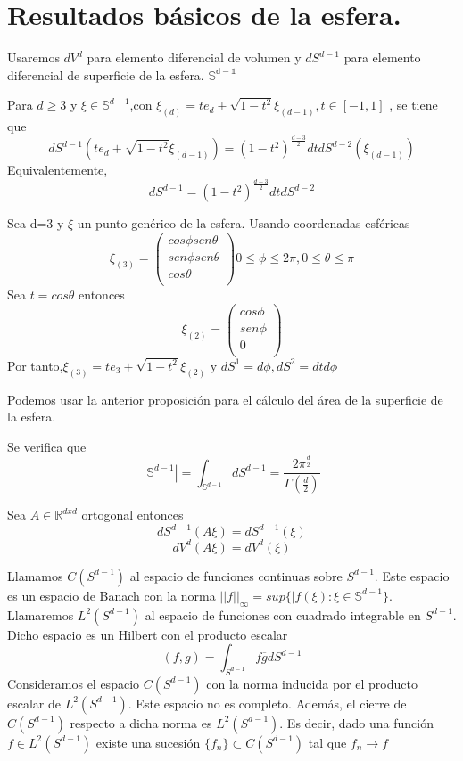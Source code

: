 \chapter{Resultados básicos de la esfera.}\label{aped.B}
Usaremos $dV^d$ para elemento diferencial de volumen y $dS^{d-1}$ para elemento diferencial de superficie de la esfera.  $\mathds{S^{d-1}}$

\begin{prop}Para $d \ge 3$ y $\xi \in \mathds{S}^{d-1}$,con $\xi_{(d)} = te_d+\sqrt{1-t^2}\xi_{(d-1)},  t\in[-1,1]$ , se tiene que
	$$
	dS^{d-1}(te_d+\sqrt{1-t^2}\xi_{(d-1)}) = (1-t^2)^{\frac{d-3}{2}}dt  dS^{d-2}(\xi_{(d-1)})
	$$
	Equivalentemente,
	$$
	dS^{d-1} = (1-t^2)^{\frac{d-3}{2}}dt dS^{d-2}
	$$
\end{prop}
\begin{example}Sea d=3 y $\xi$ un punto genérico de la esfera. Usando coordenadas esféricas $$
	\xi_{(3)}=\begin{pmatrix}
	cos\phi sen\theta\\
	sen\phi sen\theta\\
	cos\theta\\
	\end{pmatrix}
	0 \le \phi \le 2\pi , 0 \le \theta \le \pi
	$$
	Sea $t=cos\theta$ entonces
	$$
	\xi_{(2)} = \begin{pmatrix}
	cos\phi\\
	sen\phi\\
	0\\
	\end{pmatrix}
	$$
	Por tanto,$ \xi_{(3)} = te_3 + \sqrt{1-t^2} \xi_{(2)}$ y $dS^1 = d\phi , dS^2 = dtd\phi$
	
\end{example}
Podemos usar la anterior proposición para el cálculo del área de la superficie de la esfera.
\begin{prop}Se verifica que
	$$
	|\mathds{S}^{d-1}| = \int_{\mathds{S}^{d-1}} dS^{d-1} = \frac{2\pi^\frac{d}{2}}{\Gamma(\frac{d}{2})}
	$$
\end{prop} 

\begin{prop}
	Sea $A\in\mathds{R}^{dxd}$ ortogonal entonces
	$$ dS^{d-1}(A\xi) =  dS^{d-1}(\xi)$$
	$$ dV^{d}(A\xi) =  dV^{d}(\xi)$$
\end{prop}

Llamamos $C(S^{d-1})$ al espacio de funciones continuas sobre  $S^{d-1}$. Este espacio es un espacio de Banach con la norma $ ||f||_\infty = sup \{ |f(\xi) : \xi\in \mathds{S}^{d-1}\}$. Llamaremos $L^2(S^{d-1})$ al espacio de funciones con cuadrado integrable en $S^{d-1}$. Dicho espacio es un Hilbert con el producto escalar$$ (f,g) = \int_{S^{d-1}} f\overline{g} dS^{d-1}
$$
Consideramos el espacio $C(S^{d-1})$ con la norma inducida por el producto escalar de $L^2(S^{d-1})$. Este espacio no es completo. Además, el cierre de $C(S^{d-1})$ respecto a dicha norma es $L^2(S^{d-1})$. Es decir, dado una función $f\in L^2(S^{d-1})$ existe una sucesión $\{f_n\} \subset C(S^{d-1})$ tal que ${f_n}\to f$

